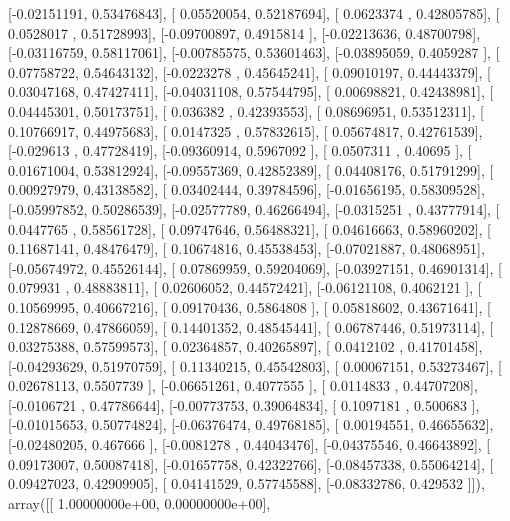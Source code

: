 \documentclass{article}
\begin{document}
       [-0.02151191,  0.53476843],
       [ 0.05520054,  0.52187694],
       [ 0.0623374 ,  0.42805785],
       [ 0.0528017 ,  0.51728993],
       [-0.09700897,  0.4915814 ],
       [-0.02213636,  0.48700798],
       [-0.03116759,  0.58117061],
       [-0.00785575,  0.53601463],
       [-0.03895059,  0.4059287 ],
       [ 0.07758722,  0.54643132],
       [-0.0223278 ,  0.45645241],
       [ 0.09010197,  0.44443379],
       [ 0.03047168,  0.47427411],
       [-0.04031108,  0.57544795],
       [ 0.00698821,  0.42438981],
       [ 0.04445301,  0.50173751],
       [ 0.036382  ,  0.42393553],
       [ 0.08696951,  0.53512311],
       [ 0.10766917,  0.44975683],
       [ 0.0147325 ,  0.57832615],
       [ 0.05674817,  0.42761539],
       [-0.029613  ,  0.47728419],
       [-0.09360914,  0.5967092 ],
       [ 0.0507311 ,  0.40695   ],
       [ 0.01671004,  0.53812924],
       [-0.09557369,  0.42852389],
       [ 0.04408176,  0.51791299],
       [ 0.00927979,  0.43138582],
       [ 0.03402444,  0.39784596],
       [-0.01656195,  0.58309528],
       [-0.05997852,  0.50286539],
       [-0.02577789,  0.46266494],
       [-0.0315251 ,  0.43777914],
       [ 0.0447765 ,  0.58561728],
       [ 0.09747646,  0.56488321],
       [ 0.04616663,  0.58960202],
       [ 0.11687141,  0.48476479],
       [ 0.10674816,  0.45538453],
       [-0.07021887,  0.48068951],
       [-0.05674972,  0.45526144],
       [ 0.07869959,  0.59204069],
       [-0.03927151,  0.46901314],
       [ 0.079931  ,  0.48883811],
       [ 0.02606052,  0.44572421],
       [-0.06121108,  0.4062121 ],
       [ 0.10569995,  0.40667216],
       [ 0.09170436,  0.5864808 ],
       [ 0.05818602,  0.43671641],
       [ 0.12878669,  0.47866059],
       [ 0.14401352,  0.48545441],
       [ 0.06787446,  0.51973114],
       [ 0.03275388,  0.57599573],
       [ 0.02364857,  0.40265897],
       [ 0.0412102 ,  0.41701458],
       [-0.04293629,  0.51970759],
       [ 0.11340215,  0.45542803],
       [ 0.00067151,  0.53273467],
       [ 0.02678113,  0.5507739 ],
       [-0.06651261,  0.4077555 ],
       [ 0.0114833 ,  0.44707208],
       [-0.0106721 ,  0.47786644],
       [-0.00773753,  0.39064834],
       [ 0.1097181 ,  0.500683  ],
       [-0.01015653,  0.50774824],
       [-0.06376474,  0.49768185],
       [ 0.00194551,  0.46655632],
       [-0.02480205,  0.467666  ],
       [-0.0081278 ,  0.44043476],
       [-0.04375546,  0.46643892],
       [ 0.09173007,  0.50087418],
       [-0.01657758,  0.42322766],
       [-0.08457338,  0.55064214],
       [ 0.09427023,  0.42909905],
       [ 0.04141529,  0.57745588],
       [-0.08332786,  0.429532  ]]), array([[  1.00000000e+00,   0.00000000e+00],
\end{document}
